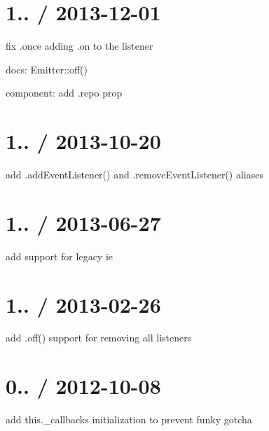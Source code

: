 \section*{1.. / 2013-\/12-\/01 }


\begin{DoxyItemize}
\item fix .once adding .on to the listener
\item docs\+: Emitter\+::off()
\item component\+: add {\ttfamily .repo} prop
\end{DoxyItemize}

\section*{1.. / 2013-\/10-\/20 }


\begin{DoxyItemize}
\item add {\ttfamily .add\+Event\+Listener()} and {\ttfamily .remove\+Event\+Listener()} aliases
\end{DoxyItemize}

\section*{1.. / 2013-\/06-\/27 }


\begin{DoxyItemize}
\item add support for legacy ie
\end{DoxyItemize}

\section*{1.. / 2013-\/02-\/26 }


\begin{DoxyItemize}
\item add {\ttfamily .off()} support for removing all listeners
\end{DoxyItemize}

\section*{0.. / 2012-\/10-\/08 }


\begin{DoxyItemize}
\item add {\ttfamily this.\+\_\+callbacks} initialization to prevent funky gotcha
\end{DoxyItemize}

